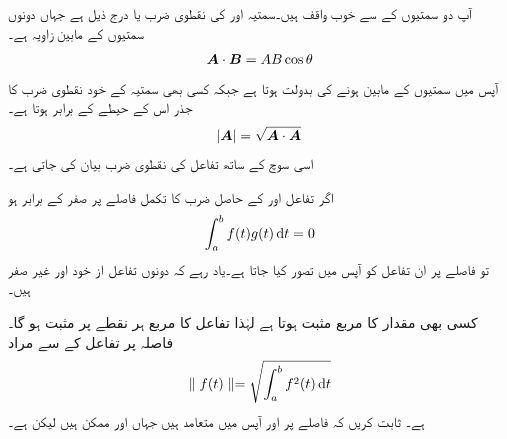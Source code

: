 آپ دو سمتیوں کے  سے خوب واقف ہیں۔سمتیہ  اور  کی نقطوی ضرب یا  درج ذیل ہے جہاں دونوں سمتیوں کے مابین زاویہ  ہے۔
\begin{align}
{\ensuremath{{\boldsymbol{A}}}} \cdot {\ensuremath{{\boldsymbol{B}}}}=A B \cos \theta
\end{align} 
آپس میں  سمتیوں کے مابین  ہونے کی بدولت  ہوتا ہے جبکہ کسی بھی سمتیہ کے خود نقطوی ضرب کا جذر اس کے حیطے  کے برابر ہوتا ہے۔
\begin{gather}
\begin{aligned}
 \abs{{{\boldsymbol{A}}}}=\sqrt{{{\boldsymbol{A}}} \cdot {\ensuremath{{\boldsymbol{A}}}}}
\end{aligned}
\end{gather}
اسی سوچ کے ساتھ تفاعل کی نقطوی ضرب بیان کی جاتی ہے۔

اگر تفاعل  اور  کے حاصل ضرب کا تکمل  فاصلے پر صفر کے برابر ہو
\begin{align}
\int_a^b f(t)g(t) \dif t=0
\end{align}
تو  فاصلے پر ان تفاعل کو آپس میں  تصور کیا جاتا ہے۔یاد رہے کہ دونوں تفاعل از خود  اور غیر صفر ہیں۔

کسی بھی مقدار کا مربع مثبت ہوتا ہے لہٰذا تفاعل کا مربع  ہر نقطے پر مثبت ہو گا۔ فاصلہ   پر تفاعل کے   سے مراد 
\begin{align}
\parallel f(t) \parallel =\sqrt{\int_a^b f^2(t) \dif t}
\end{align}
ہے۔
ثابت کریں کہ   فاصلے پر  اور  آپس میں متعامد ہیں جہاں  اور  ممکن ہیں لیکن  ہے۔

